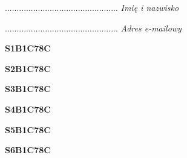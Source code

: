 \begin{turn}{90}\begin{minipage}{\linewidth} \vspace{20mm} ................................................  \textit{Imię i nazwisko}\end{minipage}\end{turn}

\begin{turn}{90}\begin{minipage}{\linewidth} \vspace{20mm} ................................................  \textit{Adres e-mailowy}\end{minipage}\end{turn}

\begin{turn}{90}\huge \begin{minipage}{\linewidth} \vspace{10mm}\textbf{S1B1C78C}\end{minipage}\end{turn}

\begin{turn}{90}\huge \begin{minipage}{\linewidth} \vspace{10mm}\textbf{S2B1C78C}\end{minipage}\end{turn}

\begin{turn}{90}\huge \begin{minipage}{\linewidth} \vspace{10mm}\textbf{S3B1C78C}\end{minipage}\end{turn}

\begin{turn}{90}\huge \begin{minipage}{\linewidth} \vspace{10mm}\textbf{S4B1C78C}\end{minipage}\end{turn}

\begin{turn}{90}\huge \begin{minipage}{\linewidth} \vspace{10mm}\textbf{S5B1C78C}\end{minipage}\end{turn}

\begin{turn}{90}\huge \begin{minipage}{\linewidth} \vspace{10mm}\textbf{S6B1C78C}\end{minipage}\end{turn}

